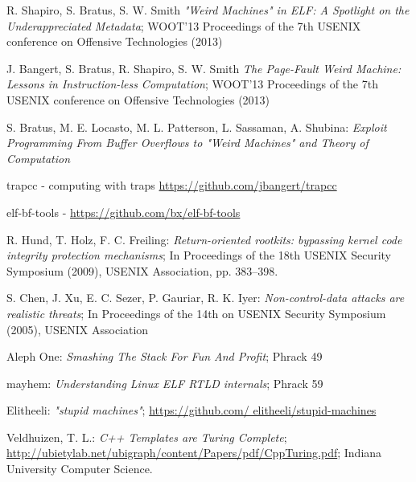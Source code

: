 \documentclass[11pt,twoside,a4paper]{article}
\begin{document}
\begin{thebibliography}{12}
 R. Shapiro, S. Bratus, S. W. Smith {\sl "Weird Machines" in ELF: A Spotlight on the Underappreciated Metadata}; WOOT'13 Proceedings of the 7th USENIX conference on Offensive Technologies (2013)

 J. Bangert, S. Bratus, R. Shapiro, S. W. Smith {\sl The Page-Fault Weird Machine: Lessons in Instruction-less Computation};  WOOT'13 Proceedings of the 7th USENIX conference on Offensive Technologies (2013)

 S. Bratus, M. E. Locasto, M. L. Patterson, L. Sassaman, A. Shubina: {\sl Exploit Programming From Buffer Overflows to "Weird Machines" and Theory of Computation}

 trapcc - computing with traps \url{https://github.com/jbangert/trapcc}

 elf-bf-tools - \url{https://github.com/bx/elf-bf-tools}

 R. Hund, T. Holz, F. C. Freiling: {\sl Return-oriented rootkits: bypassing kernel code integrity protection mechanisms}; In Proceedings of the 18th USENIX Security Symposium (2009), USENIX Association, pp. 383–398.

 S. Chen, J. Xu, E. C. Sezer, P. Gauriar, R. K. Iyer: {\sl Non-control-data attacks are realistic threats}; In Proceedings of the 14th on USENIX Security Symposium (2005), USENIX Association

 Aleph One: {\sl Smashing The Stack For Fun And Profit}; Phrack 49

 mayhem: {\sl Understanding Linux ELF RTLD internals}; Phrack 59

 Elitheeli: {\sl "stupid machines"}; \url{https://github.com/ elitheeli/stupid-machines}

 Veldhuizen, T. L.:  {\sl C++ Templates are Turing Complete}; \url{http://ubietylab.net/ubigraph/content/Papers/pdf/CppTuring.pdf}; Indiana University Computer Science.
\end{thebibliography}
\end{document}
